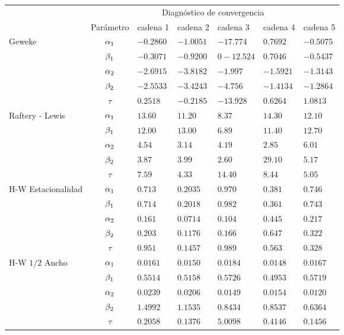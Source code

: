 \begin{table}[!h]
\centering
\begin{tabular}{|l|c|l|l|l|l|l|}
\hline
& \multicolumn{6}{|c|}{Diagnóstico de convergencia} \\
\cline{2-7}
& Parámetro & cadena 1  & cadena 2  & cadena 3 & cadena 4 & cadena 5	 \\
\hline \hline
\multirow{5}{2.5cm}{Geweke} & $\alpha_1$ & $-0.2860$ & $-1.0051$ & $-17.774$ & $0.7692$  & $ -0.5075$\\ \cline{2-7}
& $\beta_1$& $-0.3071 $ & $-0.9200$ & $0-12.524$ & $0.7046 $ & $ -0.5437 $\\
\cline{2-7}
& $\alpha_2$& $-2.6915 $ & $-3.8182 $ & $-1.997$ & $ -1.5921$ & $-1.3143 $\\
\cline{2-7}
& $\beta_2$& $-2.5533$ & $-3.4243$ & $-4.756$ & $ -1.4134$ & $-1.2864$\\
\cline{2-7}
& $\tau $& $0.2518  $ & $-0.2185 $ & $-13.928$ & $0.6264$ & $1.0813$\\
  \cline{1-7}
  \multirow{5}{2.5cm}{Raftery - Lewis} & $\alpha_1$ & $13.60$ & $11.20  $ & $8.37  $ & $14.30$  & $  12.10 $\\ \cline{2-7}
& $\beta_1$& $12.00 $ & $13.00 $ & $6.89$ & $11.40$ & $ 12.70 $\\
\cline{2-7}
& $\alpha_2$ & $4.54  $ & $3.14  $ & $4.19 $ & $2.85$ & $6.01 $\\
\cline{2-7}
& $\beta_2$& $3.87 $ & $3.99$ & $2.60 $ & $29.10 $ & $5.17$\\
\cline{2-7}
& $\tau $& $7.59 $ & $4.33 $ & $14.40$ & $ 8.44 $ & $ 5.05$\\
  \cline{1-7}
  \multirow{5}{2.5cm}{H-W Estacionalidad} & $\alpha_1$ & $0.713$ & $0.2035  $ & $ 0.970$ & $0.381$  & $0.746$\\ \cline{2-7}
& $\beta_1$& $0.714  $ & $0.2018  $ & $0.982$ & $0.361$ & $0.743$\\
\cline{2-7}
& $\alpha_2$& $0.161$ & $0.0714$ & $0.104$ & $0.445$ & $0.217$\\
\cline{2-7}
& $\beta_2$& $0.203 $ & $0.1176 $ & $0.166$ & $0.647$ & $0.322$\\
\cline{2-7}
& $\tau$& $0.951 $ & $0.1457  $ & $0.989$ & $0.563$ & $0.328$\\
  \cline{1-7}
  \multirow{5}{2.5cm}{H-W $1/2$ Ancho} & $\alpha_1$ & $0.0161$ & $0.0150 $ & $0.0184$ & $0.0148 $  & $ 0.0167 $\\ \cline{2-7}
& $\beta_1$& $0.5514 $ & $0.5158$ & $0.5726$ & $0.4953$ & $0.5719$\\
\cline{2-7}
& $\alpha_2$& $0.0239 $ & $0.0206$ & $0.0149$ & $0.0154$ & $0.0120$\\
\cline{2-7}
& $\beta_2$& $1.4992$ & $1.1535$ & $0.8434$ & $ 0.8537$ & $0.6364$\\
\cline{2-7}
& $\tau$& $0.2058  $ & $0.1376$ & $5.0098 $ & $0.4146$ & $0.1456$\\
  \cline{1-7}


\end{tabular}
\end{table}
